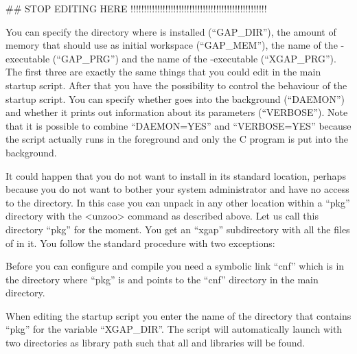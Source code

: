 \begintt
##  STOP EDITING HERE !!!!!!!!!!!!!!!!!!!!!!!!!!!!!!!!!!!!!!!!!!!!!!!!!!!
\endtt

You can specify the directory where {\GAP} is installed (``GAP\_DIR''), 
the amount of memory that {\GAP} should use as initial workspace
(``GAP\_MEM''), the name of the {\GAP}-executable (``GAP\_PRG'') and the
name of the {\XGAP}-executable (``XGAP\_PRG''). The first three are exactly 
the same things that you could edit in the main {\GAP} startup script.
After that you have the possibility to control the behaviour of the {\XGAP}
startup script. You can specify whether {\XGAP} goes into the background
(``DAEMON'') and whether it prints out information about its parameters
(``VERBOSE''). Note that it is possible to combine ``DAEMON=YES''
and ``VERBOSE=YES'' because the script actually runs in the foreground and
only the C program is put into the background.



It could happen that you do not want to install {\XGAP} in its
standard location, perhaps because you do not want to bother your
system administrator and have no access to the {\GAP} directory. In
this case you can unpack {\XGAP} in any other location within a
``pkg'' directory with the <unzoo> command as described above. Let us
call this directory ``pkg'' for the moment. You get an ``xgap''
subdirectory with all the files of {\XGAP} in it. You follow the
standard procedure with two exceptions:

Before you can configure and compile {\XGAP} you need a symbolic link
``cnf'' which is in the directory where ``pkg'' is and points to the ``cnf''
directory in the main {\GAP} directory.

When editing the startup script you enter the name of the directory
that contains ``pkg'' for the variable ``XGAP_DIR''. The script will
automatically launch {\GAP} with two directories as library path such
that all {\GAP} and {\XGAP} libraries will be found.


